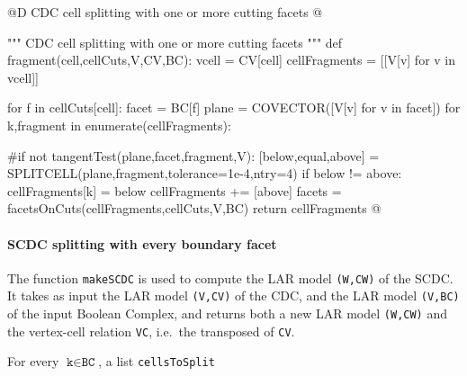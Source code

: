 \documentclass[11pt,oneside]{article}	%
\begin{document}
@D CDC cell splitting with one or more cutting facets
@{""" CDC cell splitting with one or more cutting facets """
def fragment(cell,cellCuts,V,CV,BC):
	vcell = CV[cell]
	cellFragments = [[V[v] for v in vcell]]
	
	for f in cellCuts[cell]:
		facet = BC[f]
		plane = COVECTOR([V[v] for v in facet])
		for k,fragment in enumerate(cellFragments):
		
			#if not tangentTest(plane,facet,fragment,V):
			[below,equal,above] = SPLITCELL(plane,fragment,tolerance=1e-4,ntry=4)
			if below != above:
				cellFragments[k] = below
				cellFragments += [above]
		facets = facetsOnCuts(cellFragments,cellCuts,V,BC)
	return cellFragments
@}

\paragraph{SCDC splitting with every boundary facet}
The function \texttt{makeSCDC} is used  to compute the LAR model \texttt{(W,CW)} of the SCDC.
It takes as input the LAR model \texttt{(V,CV)} of the CDC, and the LAR model \texttt{(V,BC)} of the input Boolean Complex, and returns both a new LAR model \texttt{(W,CW)} and the vertex-cell relation \texttt{VC}, i.e.~the transposed of \texttt{CV}.

For every $\texttt{k} \in \texttt{BC}$, a list \texttt{cellsToSplit}
\end{document}
